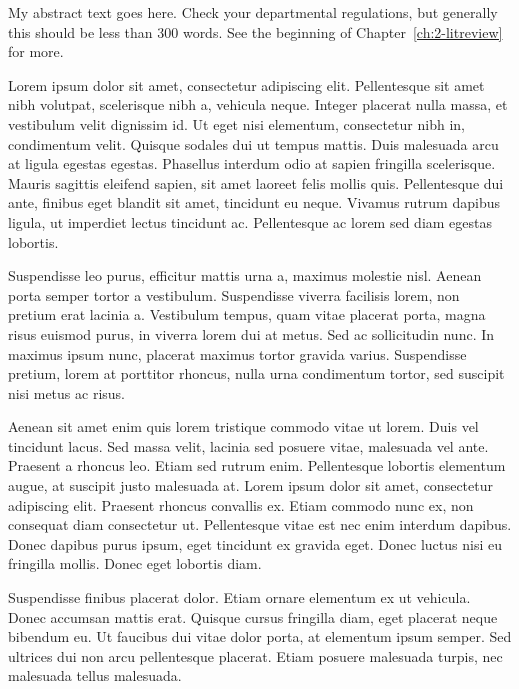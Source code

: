 My abstract text goes here.  Check your departmental regulations, but generally this should be less than 300 words.  See the beginning of Chapter~\ref{ch:2-litreview} for more.

Lorem ipsum dolor sit amet, consectetur adipiscing elit. Pellentesque sit amet nibh volutpat, scelerisque nibh a, vehicula neque. Integer placerat nulla massa, et vestibulum velit dignissim id. Ut eget nisi elementum, consectetur nibh in, condimentum velit. Quisque sodales dui ut tempus mattis. Duis malesuada arcu at ligula egestas egestas. Phasellus interdum odio at sapien fringilla scelerisque. Mauris sagittis eleifend sapien, sit amet laoreet felis mollis quis. Pellentesque dui ante, finibus eget blandit sit amet, tincidunt eu neque. Vivamus rutrum dapibus ligula, ut imperdiet lectus tincidunt ac. Pellentesque ac lorem sed diam egestas lobortis.

Suspendisse leo purus, efficitur mattis urna a, maximus molestie nisl. Aenean porta semper tortor a vestibulum. Suspendisse viverra facilisis lorem, non pretium erat lacinia a. Vestibulum tempus, quam vitae placerat porta, magna risus euismod purus, in viverra lorem dui at metus. Sed ac sollicitudin nunc. In maximus ipsum nunc, placerat maximus tortor gravida varius. Suspendisse pretium, lorem at porttitor rhoncus, nulla urna condimentum tortor, sed suscipit nisi metus ac risus.

Aenean sit amet enim quis lorem tristique commodo vitae ut lorem. Duis vel tincidunt lacus. Sed massa velit, lacinia sed posuere vitae, malesuada vel ante. Praesent a rhoncus leo. Etiam sed rutrum enim. Pellentesque lobortis elementum augue, at suscipit justo malesuada at. Lorem ipsum dolor sit amet, consectetur adipiscing elit. Praesent rhoncus convallis ex. Etiam commodo nunc ex, non consequat diam consectetur ut. Pellentesque vitae est nec enim interdum dapibus. Donec dapibus purus ipsum, eget tincidunt ex gravida eget. Donec luctus nisi eu fringilla mollis. Donec eget lobortis diam.

Suspendisse finibus placerat dolor. Etiam ornare elementum ex ut vehicula. Donec accumsan mattis erat. Quisque cursus fringilla diam, eget placerat neque bibendum eu. Ut faucibus dui vitae dolor porta, at elementum ipsum semper. Sed ultrices dui non arcu pellentesque placerat. Etiam posuere malesuada turpis, nec malesuada tellus malesuada.